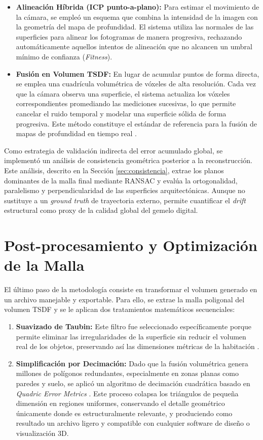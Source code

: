 \documentclass[12pt, a4, twoside, openany]{report}
\begin{document}
\begin{itemize}
    \item \textbf{Alineación Híbrida (ICP punto-a-plano):} Para estimar el movimiento de la cámara, se empleó un esquema que combina la intensidad de la imagen con la geometría del mapa de profundidad. El sistema utiliza las normales de las superficies para alinear los fotogramas de manera progresiva, rechazando automáticamente aquellos intentos de alineación que no alcancen un umbral mínimo de confianza (\textit{Fitness}).
    \item \textbf{Fusión en Volumen TSDF:} En lugar de acumular puntos de forma directa, se emplea una cuadrícula volumétrica de vóxeles de alta resolución. Cada vez que la cámara observa una superficie, el sistema actualiza los vóxeles correspondientes promediando las mediciones sucesivas, lo que permite cancelar el ruido temporal y modelar una superficie sólida de forma progresiva. Este método constituye el estándar de referencia para la fusión de mapas de profundidad en tiempo real \cite{curless1996volumetric}.
\end{itemize}

Como estrategia de validación indirecta del error acumulado global, se implementó un análisis de consistencia geométrica posterior a la reconstrucción. Este análisis, descrito en la Sección \ref{sec:consistencia}, extrae los planos dominantes de la malla final mediante RANSAC y evalúa la ortogonalidad, paralelismo y perpendicularidad de las superficies arquitectónicas. Aunque no sustituye a un \textit{ground truth} de trayectoria externo, permite cuantificar el \textit{drift} estructural como proxy de la calidad global del gemelo digital.

\section{Post-procesamiento y Optimización de la Malla}

El último paso de la metodología consiste en transformar el volumen generado en un archivo manejable y exportable. Para ello, se extrae la malla poligonal del volumen TSDF y se le aplican dos tratamientos matemáticos secuenciales:

\begin{enumerate}
    \item \textbf{Suavizado de Taubin:} Este filtro fue seleccionado específicamente porque permite eliminar las irregularidades de la superficie sin reducir el volumen real de los objetos, preservando así las dimensiones métricas de la habitación \cite{taubin1995signal}.
    \item \textbf{Simplificación por Decimación:} Dado que la fusión volumétrica genera millones de polígonos redundantes, especialmente en zonas planas como paredes y suelo, se aplicó un algoritmo de decimación cuadrática basado en \textit{Quadric Error Metrics} \cite{garland1997surface}. Este proceso colapsa los triángulos de pequeña dimensión en regiones uniformes, conservando el detalle geométrico únicamente donde es estructuralmente relevante, y produciendo como resultado un archivo ligero y compatible con cualquier software de diseño o visualización 3D.
\end{enumerate}
\end{document}
